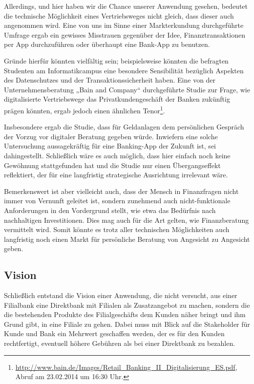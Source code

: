 	Allerdings, und hier haben wir die Chance unserer Anwendung gesehen, bedeutet die technische Möglichkeit eines Vertriebsweges nicht gleich, dass dieser auch angenommen wird. Eine von uns im Sinne einer Markterkundung durchgeführte Umfrage ergab ein gewisses Misstrauen gegenüber der Idee, Finanztransaktionen per App durchzuführen oder überhaupt eine Bank-App zu benutzen.
	
	Gründe hierfür könnten vielfältig sein; beispielsweise könnten die befragten Studenten am Informatikcampus eine besondere Sensibilität bezüglich Aspekten des Datenschutzes und der Transaktionssicherheit haben. Eine von der Unternehmensberatung „Bain and Company“ durchgeführte Studie zur Frage, wie digitalisierte Vertriebswege das Privatkundengeschäft der Banken zukünftig prägen könnten, ergab jedoch einen ähnlichen Tenor\footnote{\url{http://www.bain.de/Images/Retail\_Banking\_II\_Digitalisierung\_ES.pdf}, Abruf am 23.02.2014 um 16:30 Uhr.}.

	Insbesondere ergab die Studie, dass für Geldanlagen dem persönlichen Gespräch der Vorzug vor digitaler Beratung gegeben würde. Inwiefern eine solche Untersuchung aussagekräftig für eine Banking-App der Zukunft ist, sei dahingestellt. Schließlich wäre es auch möglich, dass hier einfach noch keine Gewöhnung stattgefunden hat und die Studie nur einen Übergangseffekt reflektiert, der für eine langfristig strategische Ausrichtung irrelevant wäre. 
 
	Bemerkenswert ist aber vielleicht auch, dass der Mensch in Finanzfragen nicht immer von Vernunft geleitet ist, sondern zunehmend auch nicht-funktionale Anforderungen in den Vordergrund stellt, wie etwa das Bedürfnis nach nachhaltigen Investitionen. Dies mag auch für die Art gelten, wie Finanzberatung vermittelt wird. Somit könnte es trotz aller technischen Möglichkeiten auch langfristig noch einen Markt für persönliche Beratung von Angesicht zu Angesicht geben.
 
\subsection{Vision}
	Schließlich entstand die Vision einer Anwendung, die nicht versucht, aus einer Filialbank eine Direktbank mit Filialen als Zusatzangebot zu machen, sondern die die bestehenden Produkte des Filialgeschäfts dem Kunden näher bringt und ihm Grund gibt, in eine Filiale zu gehen. Dabei muss mit Blick auf die Stakeholder für Kunde und Bank ein Mehrwert geschaffen werden, der es für den Kunden rechtfertigt, eventuell höhere Gebühren als bei einer Direktbank zu bezahlen.

